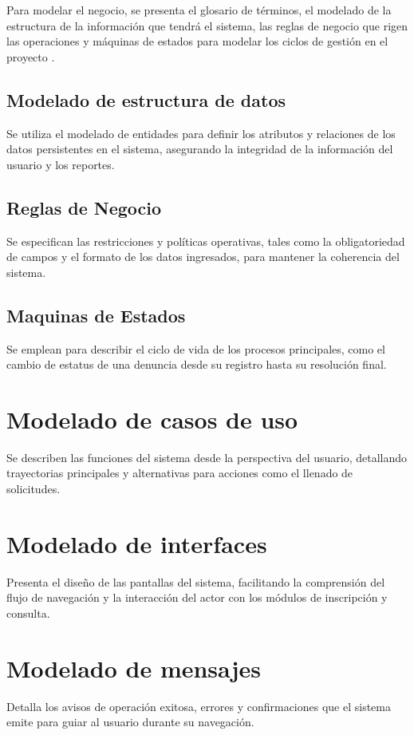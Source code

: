         Para modelar el negocio, se presenta el glosario de términos, el modelado de la estructura de la información que tendrá el sistema, las reglas de negocio que rigen las operaciones y máquinas de estados para modelar los ciclos de gestión en el proyecto \varProyecto.

        \subsection{Modelado de estructura de datos}
        \label{sec:ModEstructuraDatos}
        Se utiliza el modelado de entidades para definir los atributos y relaciones de los datos persistentes en el sistema, asegurando la integridad de la información del usuario y los reportes.
        
        \subsection{Reglas de Negocio}
        \label{sec:ModReglasNegocio}
        Se especifican las restricciones y políticas operativas, tales como la obligatoriedad de campos y el formato de los datos ingresados, para mantener la coherencia del sistema.
        
        \subsection{Maquinas de Estados}
        \label{sec:ModMaquinas}
        Se emplean para describir el ciclo de vida de los procesos principales, como el cambio de estatus de una denuncia desde su registro hasta su resolución final.
    
    \clearpage
    \section{Modelado de casos de uso}
    Se describen las funciones del sistema desde la perspectiva del usuario, detallando trayectorias principales y alternativas para acciones como el llenado de solicitudes.

    \section{Modelado de interfaces}
    Presenta el diseño de las pantallas del sistema, facilitando la comprensión del flujo de navegación y la interacción del actor con los módulos de inscripción y consulta.

    \section{Modelado de mensajes}
    Detalla los avisos de operación exitosa, errores y confirmaciones que el sistema emite para guiar al usuario durante su navegación.